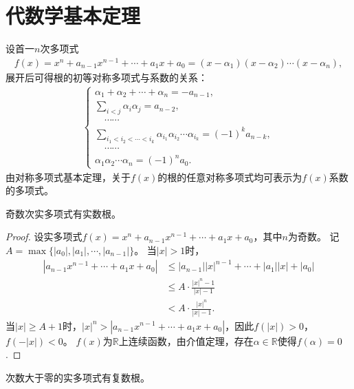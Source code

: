 \documentclass[../../main.tex]{subfiles}%
\begin{document}
\section{代数学基本定理}

设首一$n$次多项式
\begin{align}
f(x)=x^n+a_{n-1}x^{n-1}+\cdots+a_1x+a_0=(x-\alpha_1)(x-\alpha_2)\cdots(x-\alpha_n),\label{eq:poly-root}
\end{align}
展开后可得根的初等对称多项式与系数的关系：
\begin{align*}
\begin{cases}
\alpha_1+\alpha_2+\cdots+\alpha_n=-a_{n-1},\\
\displaystyle\sum\limits_{i<j}\alpha_i\alpha_j=a_{n-2},\\
\quad\cdots\cdots\\
\displaystyle\sum\limits_{i_1<i_2<\cdots<i_k}\alpha_{i_1}\alpha_{i_2}\cdots\alpha_{i_k}=(-1)^k a_{n-k},\\
\quad\cdots\cdots\\
\alpha_1\alpha_2\cdots\alpha_n=(-1)^n a_0.
\end{cases}
\end{align*}
由对称多项式基本定理，关于$f(x)$的根的任意对称多项式均可表示为$f(x)$系数的多项式。

\begin{lemma}
奇数次实多项式有实数根。
\end{lemma}

\begin{proof}
设实多项式$f(x)=x^n+a_{n-1}x^{n-1}+\cdots+a_1x+a_0$，其中$n$为奇数。
记$A=\max\{|a_0|,|a_1|,\cdots,|a_{n-1}|\}$。
当$|x|>1$时，
\begin{align*}
|a_{n-1}x^{n-1}+\cdots+a_1x+a_0|&\leqslant|a_{n-1}||x|^{n-1}+\cdots+|a_1||x|+|a_0|\\
&\leqslant A\cdot\frac{|x|^n-1}{|x|-1}\\
&<A\cdot\frac{|x|^n}{|x|-1}.
\end{align*}
当$|x|\geqslant A+1$时，$|x|^n>|a_{n-1}x^{n-1}+\cdots+a_1x+a_0|$，因此$f(|x|)>0$，$f(-|x|)<0$。
$f(x)$为$\mathbb{R}$上连续函数，由介值定理，存在$\alpha\in\mathbb{R}$使得$f(\alpha)=0$.
\end{proof}

\begin{lemma}
次数大于零的实多项式有复数根。
\end{lemma}
\end{document}
